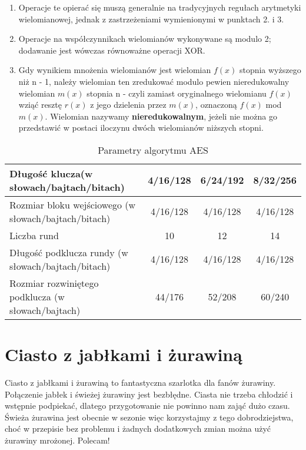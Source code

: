 \documentclass[12pt, letterpaper, titlepage]{article}
\begin{document}
\begin{enumerate}
\item Operacje te opierać się muszą generalnie na tradycyjnych regułach arytmetyki wielomianowej,
jednak z zastrzeżeniami wymienionymi w punktach 2. i 3.
\item Operacje na współczynnikach wielomianów wykonywane są modulo 2; dodawanie jest
wówczas równoważne operacji XOR.
\item Gdy wynikiem mnożenia wielomianów jest wielomian $f(x)$ stopnia wyższego niż n -
1, należy wielomian ten zredukować modulo pewien nieredukowalny wielomian $m(x)$
stopnia n - czyli zamiast oryginalnego wielomianu $f(x)$ wziąć resztę $r(x)$ z jego dzielenia
przez $m(x)$, oznaczoną $f(x)$ mod $m(x)$. Wielomian nazywamy \textbf{nieredukowalnym}, jeżeli
nie można go przedstawić w postaci iloczynu dwóch wielomianów niższych stopni.
\end{enumerate}
\begin{table}[h]
\centering\caption{Parametry algorytmu AES \cite{text2}}
\begin{tabular}{| l | c | c | c |}
\hline
Długość klucza(w słowach/bajtach/bitach) & 4/16/128 & 6/24/192 & 8/32/256 \\
\hline
Rozmiar bloku wejściowego (w słowach/bajtach/bitach) & 4/16/128 & 4/16/128 & 4/16/128 \\
\hline
Liczba rund & 10 & 12 & 14 \\
\hline
Długość podklucza rundy (w słowach/bajtach/bitach) & 4/16/128 & 4/16/128 & 4/16/128 \\
\hline
Rozmiar rozwiniętego podklucza (w słowach/bajtach) & 44/176 & 52/208 & 60/240 \\
\hline
\end{tabular}
\end{table}
\newpage
\section{Ciasto z jabłkami i żurawiną}
Ciasto z jabłkami i żurawiną \cite{text3} to fantastyczna szarlotka dla fanów żurawiny. Połączenie
jabłek i świeżej żurawiny jest bezbłędne. Ciasta nie trzeba chłodzić i wstępnie podpiekać,
dlatego przygotowanie nie powinno nam zająć dużo czasu. Świeża żurawina jest obecnie w
sezonie więc korzystajmy z tego dobrodziejstwa, choć w przepisie bez problemu i żadnych
dodatkowych zmian można użyć żurawiny mrożonej. Polecam!
\end{document}
